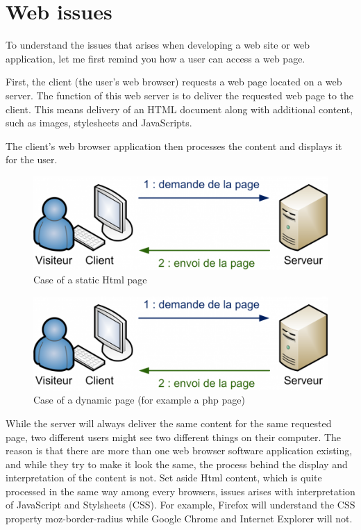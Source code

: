 \section{Web issues}

To understand the issues that arises when developing a web site or web application, let me first remind you how a user can access a web page.
\begin{itemize*}
\item First, the client (the user's web browser) requests a web page located on a web server. The function of this web server is to deliver the requested web page to the client. This means delivery of an HTML document along with additional content, 
such as images, stylesheets and JavaScripts.
\item The client's web browser application then processes the content and displays it for the user.  
\end{itemize*}

\begin{figure}[!ht]
\centering
\includegraphics[width=.55\textwidth]{img/static.png}
\caption{Case of a static Html page}
\label{figure:static-page}
\end{figure}

\begin{figure}[!ht]
\centering
\includegraphics[width=.55\textwidth]{img/static.png}
\caption{Case of a dynamic page (for example a php page)}
\label{figure:dynamic-page}
\end{figure}

While the server will always deliver the same content for the same requested page, two different users might see two different things on their computer. 
The reason is that there are more than one web browser software application existing, and while they try to make it look the same, the process behind the display and interpretation of the content is not. Set aside Html content, which is quite processed in the same way among every browsers, issues arises with interpretation of
JavaScript and Stylsheets (CSS). For example, Firefox will understand the CSS property moz-border-radius while Google Chrome and Internet Explorer will not. 

